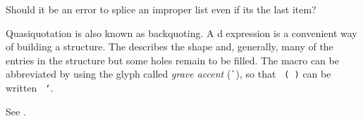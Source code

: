 \gdef\module{syntax-0}
\label{backquote}
%
\begin{optPrivate}
    Should it be an error to splice an improper list even if its the last item?
\end{optPrivate}
%
\begin{optDefinition}

%
\Syntax
{}%
%
\remarks%
Quasiquotation is also known as backquoting.  A d
expression is a convenient way of building a structure.  The 
describes the shape and, generally, many of the entries in the structure but
some holes remain to be filled.  The  macro can be
abbreviated by using the glyph called {\em grave accent}
(\verb+`+), so that {\tt
    ( )} can be written {\tt
    `}.

\Syntax
{}%
%
\remarks%
See .


\end{optDefinition}
